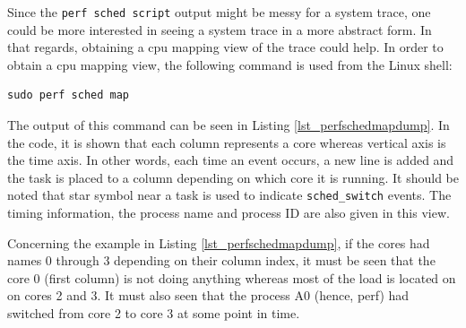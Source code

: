 \begin{itemize}
	
	
	Since the \texttt{perf sched script} output might be messy for a system trace, one could be more interested in seeing a system trace in a more abstract form. In that regards, obtaining a cpu mapping view of the trace could help. In order to obtain a cpu mapping view, the following command is used from the Linux shell:
	\begin{lstlisting}[style=bash]
		sudo perf sched map
	\end{lstlisting}
	The output of this command can be seen in Listing \ref{lst_perfschedmapdump}. In the code, it is shown that each column represents a core whereas vertical axis is the time axis. In other words, each time an event occurs, a new line is added and the task is placed to a column depending on which core it is running. It should be noted that star symbol near a task is used to indicate \texttt{sched\texttt{\_}switch} events. The timing information, the process name and process ID are also given in this view. 
	
	Concerning the example in Listing \ref{lst_perfschedmapdump}, if the cores had names 0 through 3 depending on their column index, it must be seen that the core 0 (first column) is not doing anything whereas most of the load is located on on cores 2 and 3. It must also seen that the process A0 (hence, perf) had switched from core 2 to core 3 at some point in time.
	

\end{itemize}
